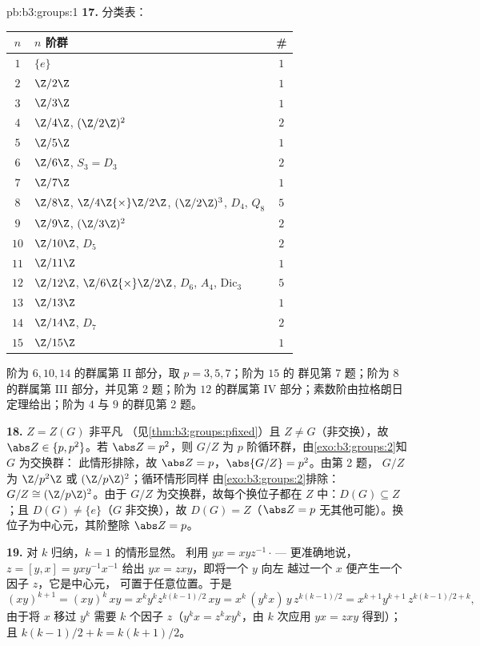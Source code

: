 \begin{solution}{pb:b3:groups:1}
\textbf{17.} 分类表：
\begin{center}
\begin{tabular}{c l c}
$n$ & $n$ 阶群 & \#\\
\hline
$1$ & $\{e\}$ & $1$\\
$2$ & $\Z/2\Z$ & $1$\\
$3$ & $\Z/3\Z$ & $1$\\
$4$ & $\Z/4\Z$, $(\Z/2\Z)^2$ & $2$\\
$5$ & $\Z/5\Z$ & $1$\\
$6$ & $\Z/6\Z$, $S_3 = D_3$ & $2$\\
$7$ & $\Z/7\Z$ & $1$\\
$8$ & $\Z/8\Z$, $\Z/4\Z{\times}\Z/2\Z$, $(\Z/2\Z)^3$, $D_4$,
      $Q_8$ & $5$\\
$9$ & $\Z/9\Z$, $(\Z/3\Z)^2$ & $2$\\
$10$ & $\Z/10\Z$, $D_5$ & $2$\\
$11$ & $\Z/11\Z$ & $1$\\
$12$ & $\Z/12\Z$, $\Z/6\Z{\times}\Z/2\Z$, $D_6$, $A_4$,
       $\mathrm{Dic}_3$ & $5$\\
$13$ & $\Z/13\Z$ & $1$\\
$14$ & $\Z/14\Z$, $D_7$ & $2$\\
$15$ & $\Z/15\Z$ & $1$\\
\end{tabular}
\end{center}
阶为 $6, 10, 14$ 的群属第 II 部分，取 $p = 3, 5, 7$；阶为 $15$ 的
群见第 7 题；阶为 $8$ 的群属第 III 部分，并见第 2 题；阶为
$12$ 的群属第 IV 部分；素数阶由拉格朗日定理给出；阶为 $4$ 与
$9$ 的群见第 2 题。

\textbf{18.} $Z = Z(G)$ 非平凡
（见\cref{thm:b3:groups:pfixed}）且 $Z \neq G$（非交换），故
$\abs Z \in \{p, p^2\}$。若 $\abs Z = p^2$，则 $G/Z$ 为
$p$ 阶循环群，由\cref{exo:b3:groups:2}知 $G$ 为交换群：
此情形排除，故 $\abs Z = p$，$\abs{G/Z} = p^2$。由第 2 题，
$G/Z$ 为 $\Z/p^2\Z$ 或 $(\Z/p\Z)^2$；循环情形同样
由\cref{exo:b3:groups:2}排除：$G/Z \cong (\Z/p\Z)^2$。由于 $G/Z$
为交换群，故每个换位子都在 $Z$ 中：$D(G) \subseteq Z$；且
$D(G) \neq \{e\}$（$G$ 非交换），故 $D(G) = Z$（$\abs Z = p$
无其他可能）。换位子为中心元，其阶整除
$\abs Z = p$。

\textbf{19.} 对 $k$ 归纳，$k = 1$ 的情形显然。
利用 $yx = xyz^{-1}\cdot$\,--- 更准确地说，$z = [y, x] =
yxy^{-1}x^{-1}$ 给出 $yx = zxy$，即将一个 $y$ 向左
越过一个 $x$ 便产生一个因子 $z$，它是中心元，
可置于任意位置。于是
\[
(xy)^{k+1} = (xy)^k\,xy = x^ky^kz^{k(k-1)/2}\,xy
= x^k\,(y^kx)\,y\,z^{k(k-1)/2}
= x^{k+1}y^{k+1}\,z^{k(k-1)/2 + k},
\]
由于将 $x$ 移过 $y^k$ 需要 $k$ 个因子 $z$（$y^kx =
z^kxy^k$，由 $k$ 次应用 $yx = zxy$ 得到）；且 $k(k-1)/2 + k
= k(k+1)/2$。


\end{solution}
